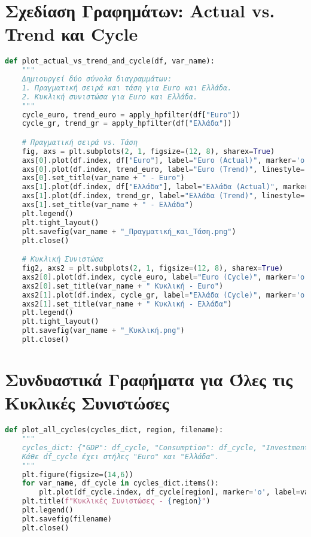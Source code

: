 \documentclass{book}
\begin{document}
\section{Σχεδίαση Γραφημάτων: Actual vs. Trend και Cycle}
\begin{tcolorbox}[colback=white,colframe=black,title=Παράδειγμα Σχεδιασμού (Actual vs. Trend και Cycle)]
\begin{lstlisting}[language=Python]
def plot_actual_vs_trend_and_cycle(df, var_name):
    """
    Δημιουργεί δύο σύνολα διαγραμμάτων:
    1. Πραγματική σειρά και τάση για Euro και Ελλάδα.
    2. Κυκλική συνιστώσα για Euro και Ελλάδα.
    """
    cycle_euro, trend_euro = apply_hpfilter(df["Euro"])
    cycle_gr, trend_gr = apply_hpfilter(df["Ελλάδα"])

    # Πραγματική σειρά vs. Τάση
    fig, axs = plt.subplots(2, 1, figsize=(12, 8), sharex=True)
    axs[0].plot(df.index, df["Euro"], label="Euro (Actual)", marker='o')
    axs[0].plot(df.index, trend_euro, label="Euro (Trend)", linestyle='--')
    axs[0].set_title(var_name + " - Euro")
    axs[1].plot(df.index, df["Ελλάδα"], label="Ελλάδα (Actual)", marker='o')
    axs[1].plot(df.index, trend_gr, label="Ελλάδα (Trend)", linestyle='--')
    axs[1].set_title(var_name + " - Ελλάδα")
    plt.legend()
    plt.tight_layout()
    plt.savefig(var_name + "_Πραγματική_και_Τάση.png")
    plt.close()

    # Κυκλική Συνιστώσα
    fig2, axs2 = plt.subplots(2, 1, figsize=(12, 8), sharex=True)
    axs2[0].plot(df.index, cycle_euro, label="Euro (Cycle)", marker='o')
    axs2[0].set_title(var_name + " Κυκλική - Euro")
    axs2[1].plot(df.index, cycle_gr, label="Ελλάδα (Cycle)", marker='o')
    axs2[1].set_title(var_name + " Κυκλική - Ελλάδα")
    plt.legend()
    plt.tight_layout()
    plt.savefig(var_name + "_Κυκλική.png")
    plt.close()
\end{lstlisting}
\end{tcolorbox}

\section{Συνδυαστικά Γραφήματα για Όλες τις Κυκλικές Συνιστώσες}
\begin{tcolorbox}[colback=white,colframe=black,title=Ομαδική Απεικόνιση των Κυκλικών Στοιχείων]
\begin{lstlisting}[language=Python]
def plot_all_cycles(cycles_dict, region, filename):
    """
    cycles_dict: {"GDP": df_cycle, "Consumption": df_cycle, "Investment": df_cycle}
    Κάθε df_cycle έχει στήλες "Euro" και "Ελλάδα".
    """
    plt.figure(figsize=(14,6))
    for var_name, df_cycle in cycles_dict.items():
        plt.plot(df_cycle.index, df_cycle[region], marker='o', label=var_name)
    plt.title(f"Κυκλικές Συνιστώσες - {region}")
    plt.legend()
    plt.savefig(filename)
    plt.close()
\end{lstlisting}
\end{tcolorbox}
\end{document}
